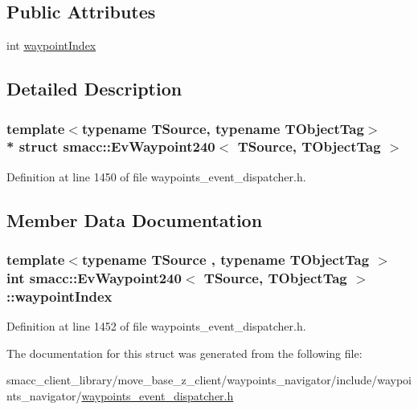 \subsection*{Public Attributes}
\begin{DoxyCompactItemize}
\item 
int \hyperlink{structsmacc_1_1EvWaypoint240_a40e3569d71dfda2604b0d59976ad2b9e}{waypoint\+Index}
\end{DoxyCompactItemize}


\subsection{Detailed Description}
\subsubsection*{template$<$typename T\+Source, typename T\+Object\+Tag$>$\\*
struct smacc\+::\+Ev\+Waypoint240$<$ T\+Source, T\+Object\+Tag $>$}



Definition at line 1450 of file waypoints\+\_\+event\+\_\+dispatcher.\+h.



\subsection{Member Data Documentation}
\subsubsection[{\texorpdfstring{waypoint\+Index}{waypointIndex}}]{\setlength{\rightskip}{0pt plus 5cm}template$<$typename T\+Source , typename T\+Object\+Tag $>$ int {\bf smacc\+::\+Ev\+Waypoint240}$<$ T\+Source, T\+Object\+Tag $>$\+::waypoint\+Index}\hypertarget{structsmacc_1_1EvWaypoint240_a40e3569d71dfda2604b0d59976ad2b9e}{}\label{structsmacc_1_1EvWaypoint240_a40e3569d71dfda2604b0d59976ad2b9e}


Definition at line 1452 of file waypoints\+\_\+event\+\_\+dispatcher.\+h.



The documentation for this struct was generated from the following file\+:\begin{DoxyCompactItemize}
\item 
smacc\+\_\+client\+\_\+library/move\+\_\+base\+\_\+z\+\_\+client/waypoints\+\_\+navigator/include/waypoints\+\_\+navigator/\hyperlink{waypoints__event__dispatcher_8h}{waypoints\+\_\+event\+\_\+dispatcher.\+h}\end{DoxyCompactItemize}
